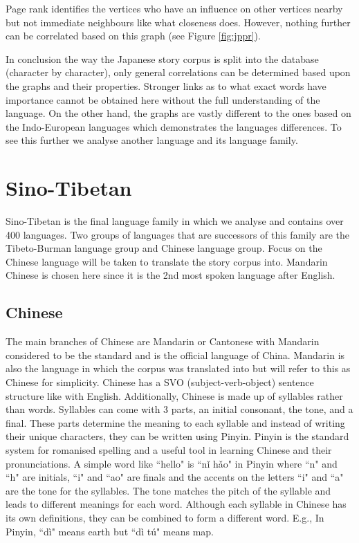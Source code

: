 Page rank identifies the vertices who have an influence on other vertices nearby but not immediate neighbours like what closeness does. However, nothing further can be correlated based on this graph (see Figure \ref{fig:jppr}).

In conclusion the way the Japanese story corpus is split into the database (character by character), only general correlations can be determined based upon the graphs and their properties. Stronger links as to what exact words have importance cannot be obtained here without the full understanding of the language. On the other hand, the graphs are vastly different to the ones based on the Indo-European languages which demonstrates the languages differences. To see this further we analyse another language and its language family.

\section{Sino-Tibetan}
Sino-Tibetan is the final language family in which we analyse and contains over 400 languages. Two groups of languages that are successors of this family are the Tibeto-Burman language group and Chinese language group. Focus on the Chinese language will be taken to translate the story corpus into. Mandarin Chinese is chosen here since it is the 2nd most spoken language after English.

\subsection{Chinese}
The main branches of Chinese are Mandarin or Cantonese with Mandarin considered to be the standard and is the official language of China. Mandarin is also the language in which the corpus was translated into but will refer to this as Chinese for simplicity. Chinese has a SVO (subject-verb-object) sentence structure like with English. Additionally, Chinese is made up of syllables \cite{ross2017modern} rather than words. Syllables can come with 3 parts, an initial consonant, the tone, and a final. These parts determine the meaning to each syllable and instead of writing their unique characters, they can be written using Pinyin. Pinyin is the standard system for romanised spelling and a useful tool in learning Chinese and their pronunciations. A simple word like ``hello" is ``nǐ hǎo" in Pinyin where ``n" and ``h" are initials, ``i" and ``ao" are finals and the accents on the letters ``i" and ``a" are the tone for the syllables. The tone matches the pitch of the syllable and leads to different meanings for each word. Although each syllable in Chinese has its own definitions, they can be combined to form a different word. E.g., In Pinyin, ``dì" means earth but ``dì tú" means map.

